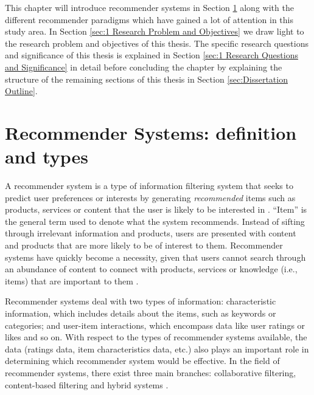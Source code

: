 This chapter will introduce recommender systems in Section \ref{sec:1 Recommender Systems: definition and types} along with the different recommender paradigms which have gained a lot of attention in this study area. In Section \ref{sec:1 Research Problem and Objectives} we draw light to the research problem and objectives of this thesis. The specific research questions and significance of this thesis is explained in Section \ref{sec:1 Research Questions and Significance} in detail before concluding the chapter by explaining the structure of the remaining sections of this thesis in Section \ref{sec:Dissertation Outline}.


\section{Recommender Systems: definition and types}
\label{sec:1 Recommender Systems: definition and types}
A recommender system is a type of information filtering system that seeks to predict user preferences or interests by generating \textit{recommended} items such as products, services or content that the user is likely to be interested in \cite{seth2022comparative}. “Item” is the general term used to denote what the system recommends. Instead of sifting through irrelevant information and products, users are presented with content and products that are more likely to be of interest to them. Recommender systems have quickly become a necessity, given that users cannot search through an abundance of content to connect with products, services or knowledge (i.e., items) that are important to them \cite{seth2022comparative}. 

Recommender systems deal with two types of information: characteristic information, which includes details about the items, such as keywords or categories; and user-item interactions, which encompass data like user ratings or likes and so on.  With respect to the types of recommender systems available, the data (ratings data, item characteristics data, etc.) also plays an important role in determining which recommender system would be effective. In the field of recommender systems, there exist three main branches: collaborative filtering, content-based filtering and hybrid systems \cite{thorat2015survey}.

